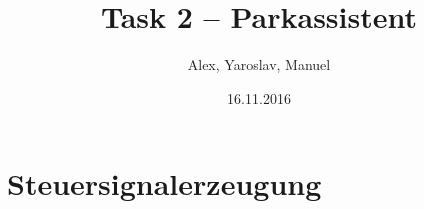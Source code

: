 \documentclass[12pt]{beamer}
\title{Task 2 -- Parkassistent}
\institute{EvoTest}
\author{Alex, Yaroslav, Manuel}
\date{16.11.2016}
\begin{document}
\maketitle 


\section{Steuersignalerzeugung}

\end{document}
